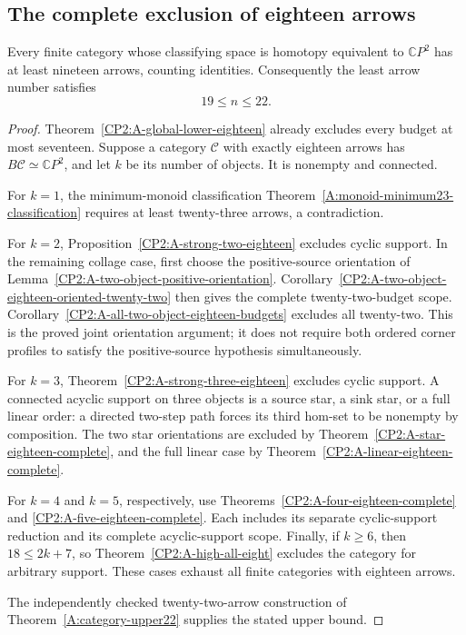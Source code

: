 \subsection{The complete exclusion of eighteen arrows}

\begin{theorem}
\label{CP2:A-global-lower-nineteen}
Every finite category whose classifying space is homotopy equivalent
to $\mathbb CP^2$ has at least nineteen arrows, counting identities.
Consequently the least arrow number satisfies
\[
 \boxed{19\leq n\leq22}.
\]
\end{theorem}
\begin{proof}
Theorem~\ref{CP2:A-global-lower-eighteen} already excludes every
budget at most seventeen.  Suppose a category $\mathcal C$ with
exactly eighteen arrows has $B\mathcal C\simeq\mathbb CP^2$,
and let $k$ be its number of objects.  It is nonempty and connected.

For $k=1$, the minimum-monoid classification
Theorem~\ref{A:monoid-minimum23-classification} requires at least
twenty-three arrows, a contradiction.

For $k=2$, Proposition~\ref{CP2:A-strong-two-eighteen} excludes
cyclic support.  In the remaining collage case, first choose the
positive-source orientation of
Lemma~\ref{CP2:A-two-object-positive-orientation}.
Corollary~\ref{CP2:A-two-object-eighteen-oriented-twenty-two}
then gives the complete twenty-two-budget scope.
Corollary~\ref{CP2:A-all-two-object-eighteen-budgets} excludes
all twenty-two.  This is the proved joint orientation argument;
it does not require both ordered corner profiles to satisfy the
positive-source hypothesis simultaneously.

For $k=3$, Theorem~\ref{CP2:A-strong-three-eighteen} excludes
cyclic support.  A connected acyclic support on three objects
is a source star, a sink star, or a full linear order: a directed
two-step path forces its third hom-set to be nonempty by composition.
The two star orientations are excluded by
Theorem~\ref{CP2:A-star-eighteen-complete}, and the full linear
case by Theorem~\ref{CP2:A-linear-eighteen-complete}.

For $k=4$ and $k=5$, respectively, use
Theorems~\ref{CP2:A-four-eighteen-complete} and
\ref{CP2:A-five-eighteen-complete}.  Each includes its separate
cyclic-support reduction and its complete acyclic-support scope.
Finally, if $k\geq6$, then $18\leq2k+7$, so
Theorem~\ref{CP2:A-high-all-eight} excludes the category for
arbitrary support.  These cases exhaust all finite categories
with eighteen arrows.

The independently checked twenty-two-arrow construction of
Theorem~\ref{A:category-upper22} supplies the stated upper bound.
\end{proof}

